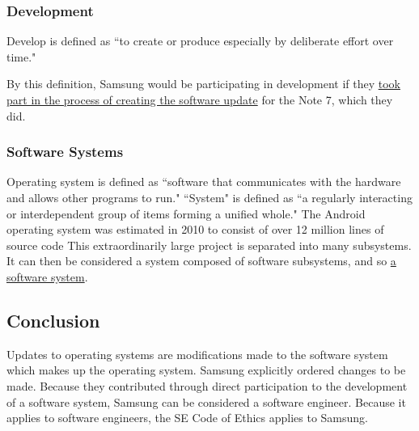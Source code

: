 \documentclass[12pt]{article}
\begin{document}
	\subsubsection{Development}
      Develop is defined as ``to create or produce especially by deliberate effort over time."\cite{merriamDefineDevelop}
	
	By this definition, Samsung would be participating in development if they \uline{took part in the process of creating the software update} for the Note 7, which they did\cite{samsungModifiedAndroid}.
	
	\subsubsection{Software Systems}
	\label{codeApplies.SoftwareSystems}
	Operating system is defined as ``software that communicates with the hardware and allows other programs to run."\cite{merriamDefineOperatingSystem} ``System" is defined as ``a regularly interacting or interdependent group of items forming a unified whole."\cite{merriamDefineSystem}
	The Android operating system was estimated in 2010 to consist of over 12 million lines of source code\cite{gubatronEstimateAndroidSourceSize} This extraordinarily large project is separated into many subsystems\cite{googleBreakdownAndroidSubsystems}. It can then be considered a system composed of software subsystems, and so \uline{a software system}.
	
   \subsection{Conclusion}
   \label{SamsungIsSEConclusion}
   Updates to operating systems are modifications made to the software system which makes up the operating system. Samsung explicitly ordered changes to be made. Because they contributed through direct participation to the development of a software system, Samsung can be considered a software engineer\cite{codeOfEthics}. Because it applies to software engineers, the SE Code of Ethics applies to Samsung.
   
   
   
\end{document}
